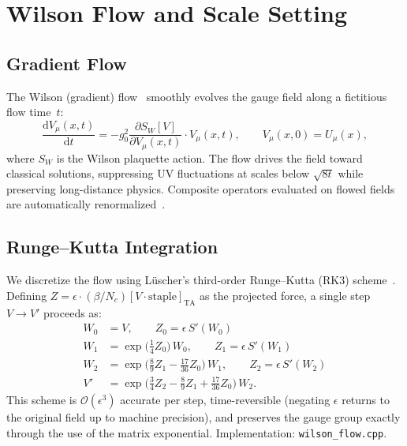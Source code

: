 \documentclass[12pt]{article}
\newcommand{\dd}{\mathrm{d}}
\newcommand{\code}[1]{\texttt{#1}}
\begin{document}
\section{Wilson Flow and Scale Setting}
\label{sec:wilson_flow}

\subsection{Gradient Flow}

The Wilson (gradient) flow~\cite{Luscher2010} smoothly evolves the gauge field along a fictitious flow time~$t$:
\begin{equation}
\label{eq:flow}
\frac{\dd V_\mu(x, t)}{\dd t} = -g_0^2 \frac{\partial S_W[V]}{\partial V_\mu(x, t)} \cdot V_\mu(x, t), \qquad V_\mu(x, 0) = U_\mu(x),
\end{equation}
where $S_W$ is the Wilson plaquette action. The flow drives the field toward classical solutions, suppressing UV fluctuations at scales below $\sqrt{8t}$ while preserving long-distance physics. Composite operators evaluated on flowed fields are automatically renormalized~\cite{Luscher2011}.

\subsection{Runge--Kutta Integration}

We discretize the flow using L\"uscher's third-order Runge--Kutta (RK3) scheme~\cite{Luscher2010}. Defining $Z = \epsilon \cdot (\beta/N_c) [V \cdot \text{staple}]_{\mathrm{TA}}$ as the projected force, a single step $V \to V'$ proceeds as:
\begin{align}
W_0 &= V, \qquad Z_0 = \epsilon \, S'(W_0) \\
W_1 &= \exp\!\big(\tfrac{1}{4} Z_0\big) \, W_0, \qquad Z_1 = \epsilon \, S'(W_1) \\
W_2 &= \exp\!\big(\tfrac{8}{9} Z_1 - \tfrac{17}{36} Z_0\big) \, W_1, \qquad Z_2 = \epsilon \, S'(W_2) \\
V' &= \exp\!\big(\tfrac{3}{4} Z_2 - \tfrac{8}{9} Z_1 + \tfrac{17}{36} Z_0\big) \, W_2.
\end{align}
This scheme is $\mathcal{O}(\epsilon^3)$ accurate per step, time-reversible (negating $\epsilon$ returns to the original field up to machine precision), and preserves the gauge group exactly through the use of the matrix exponential. Implementation: \code{wilson\_flow.cpp}.
\end{document}
